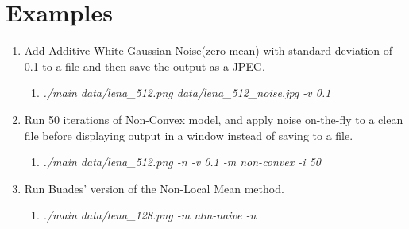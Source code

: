 \documentclass{article}
\begin{document}
\section{Examples}
\begin{enumerate}
\item
    Add Additive White Gaussian Noise(zero-mean) with standard deviation of
    0.1 to a file and then save the output as a JPEG.
    \begin{enumerate}
        \item[] \emph{./main data/lena\_512.png data/lena\_512\_noise.jpg -v 0.1}
    \end{enumerate}
\item
    Run 50 iterations of Non-Convex model, and apply noise on-the-fly to a
    clean file before displaying output in a window instead of saving to a
    file.
    \begin{enumerate}
        \item[] \emph{./main data/lena\_512.png -n -v 0.1 -m non-convex -i 50}
    \end{enumerate}
\item
    Run Buades' version of the Non-Local Mean method.
    \begin{enumerate}
        \item[] \emph{./main data/lena\_128.png -m nlm-naive -n
        }
    \end{enumerate}
\end{enumerate}
\end{document}
